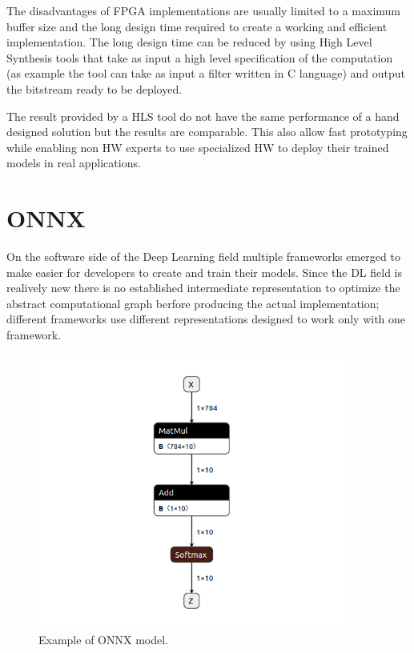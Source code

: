 \documentclass[../main.tex]{subfiles}
\begin{document}
The disadvantages of FPGA implementations are usually limited to a maximum buffer size and the long design time required to create a working and efficient implementation.
The long design time can be reduced by using High Level Synthesis tools that take as input a high level specification of the computation (as example the tool can take as input a filter written in C language) and output the bitstream ready to be deployed.

The result provided by a HLS tool do not have the same performance of a hand designed solution but the results are comparable. 
This also allow fast prototyping while enabling non HW experts to use specialized HW to deploy their trained models in real applications.

\section{ONNX}
\label{ONNX}

On the software side of the Deep Learning field multiple frameworks emerged to make easier for developers to create and train their models.
Since the DL field is realively new there is no established intermediate representation to optimize the abstract computational graph berfore producing the actual implementation; different frameworks use different representations designed to work only with one framework.

\begin{figure}[h!]
  \includegraphics[width=0.9\textwidth]{images/ONNXExample.png}
  \centering
  \caption{Example of ONNX model.}
  \label{fig:onnx-example}
\end{figure}
\end{document}
